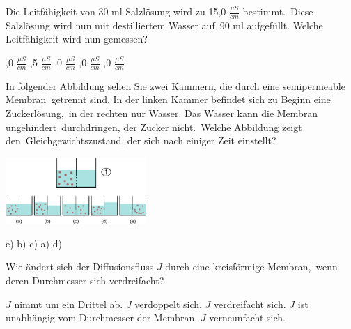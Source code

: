 \documentclass[11pt]{exam}
\begin{document}
\setlength{\voffset}{-0.5in}
\setlength{\headsep}{5pt}

\hspace{2mm}
 \hspace{5mm}
\vspace{4mm}

\begin{questions}

\question Die Leitfähigkeit von 30 ml Salzlösung wird zu 15,0 \( \frac{\mu S}{cm} \) bestimmt. Diese Salzlösung wird nun mit destilliertem Wasser auf 90 ml aufgefüllt. Welche Leitfähigkeit wird nun gemessen?

\begin{choices}
	,0 \( \frac{\mu S}{cm} \)
	,5 \( \frac{\mu S}{cm} \)
	,0 \( \frac{\mu S}{cm} \)
	,0 \( \frac{\mu S}{cm} \)
	,0 \( \frac{\mu S}{cm} \)
\end{choices}

\vspace{3mm}\question In folgender Abbildung sehen Sie zwei Kammern, die durch eine semipermeable Membran getrennt sind. In der linken Kammer befindet sich zu Beginn eine Zuckerlösung, in der rechten nur Wasser. Das Wasser kann die Membran ungehindert durchdringen, der Zucker nicht. Welche Abbildung zeigt den Gleichgewichtszustand, der sich nach einiger Zeit einstellt? 

\includegraphics[width=0.4\textwidth]{images/Osmose.png}

\begin{choices}
	\choice e)
	\choice b)
	\choice c)
	\choice a)
	\choice d)
\end{choices}

\vspace{3mm}\question Wie ändert sich der Diffusionsfluss \( J \) durch eine kreisförmige Membran, wenn deren Durchmesser sich verdreifacht?

\begin{choices}
	\choice \( J \) nimmt um ein Drittel ab.
	\choice \( J \) verdoppelt sich.
	\choice \( J \) verdreifacht sich.
	\choice \( J \) ist unabhängig vom Durchmesser der Membran.
	\choice \( J \) verneunfacht sich.
\end{choices}


\end{questions}
\end{document}
